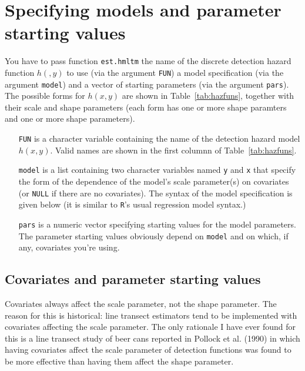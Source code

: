 \documentclass{article}
\begin{document}


\section{Specifying models and parameter starting values}

You have to pass function \verb|est.hmltm| the name of the discrete detection hazard function $h(,y)$ to use (via the argument \verb|FUN|) a model specification (via the argument \verb|model|) and a vector of starting parameters (via the argument \verb|pars|). The possible forms for $h(x,y)$ are shown in Table~\ref{tab:hazfuns}, together with their scale and shape parameters (each form has one or more shape paramters and one or more shape parameters). 

\begin{itemize}
\item[{\tt FUN}] is a character variable containing the name of the detection hazard model $h(x,y)$. Valid names are shown in the first columnn of Table~\ref{tab:hazfuns}.
\item[{\tt model}] is a list containing two character variables named \verb|y| and \verb|x| that specify the form of the dependence of the model's scale parameter(s) on covariates (or \verb|NULL| if there are no covariates). The syntax of the model specification is given below (it is similar to \verb|R|'s usual regression model syntax.)
\item[{\tt pars}] is a numeric vector specifying starting values for the model parameters. The parameter starting values obviously depend on \verb|model| and on which, if any, covariates you're using. 
\end{itemize}

\subsection{Covariates and parameter starting values}

Covariates always affect the scale parameter, not the shape parameter. The reason for this is historical: line transect estimators tend to be implemented with covariates affecting the scale parameter. The only rationale I have ever found for this is a line transect study of beer cans reported in Pollock et al. (1990) in which having covariates affect the scale parameter of detection functions was found to be more effective than having them affect the shape parameter.
\end{document}

